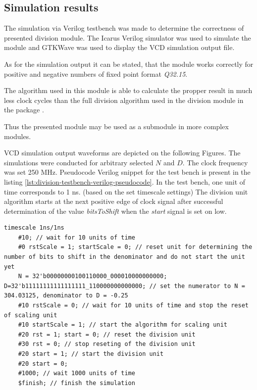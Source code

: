 \documentclass[a4paper, twoside, 11pt]{article}
\begin{document}
\subsection{Simulation results}
The simulation via Verilog testbench was made to determine the correctness of presented division module. The Icarus Verilog simulator was used to simulate the module and GTKWave was used to display the VCD simulation output file.\par
As for the simulation output it can be stated, that the module works correctly for positive and negative numbers of fixed point format \textit{Q32.15}.\par
The algorithm used in this module is able to calculate the propper result in much less clock cycles than the full division algorithm used in the division module in the package \cite{burke-fixed-point-math-library}.\par
Thus the presented module may be used as a submodule in more complex modules.\par
VCD simulation output waveforms are depicted on the following Figures. The simulations were conducted for arbitrary selected $N$ and $D$. The clock frequency was set 250 MHz. Pseudocode Verilog snippet for the test bench is present in the listing \ref{lst:division-testbench-verilog-pseudocode}. In the test bench, one unit of time corresponds to 1 ns. (based on the set timescale settings) The division unit algorithm starts at the next positive edge of clock signal after successful determination of the value \textit{bitsToShift} when the \textit{start} signal is set on low.

\begin{lstlisting}[language={pseudocode}, caption={Pseudocode snippet for the Verilog simulation test bench.}, label= {lst:division-testbench-verilog-pseudocode}]
    timescale 1ns/1ns 
    #10; // wait for 10 units of time
    #0 rstScale = 1; startScale = 0; // reset unit for determining the number of bits to shift in the denominator and do not start the unit yet
    N = 32'b00000000100110000_000010000000000; D=32'b11111111111111111_110000000000000; // set the numerator to N = 304.03125, denominator to D = -0.25
    #10 rstScale = 0; // wait for 10 units of time and stop the reset of scaling unit
    #10 startScale = 1; // start the algorithm for scaling unit
    #20 rst = 1; start = 0; // reset the division unit
    #30 rst = 0; // stop reseting of the division unit
    #20 start = 1; // start the division unit
    #20 start = 0;
    #1000; // wait 1000 units of time
    $finish; // finish the simulation
\end{lstlisting}
\end{document}
